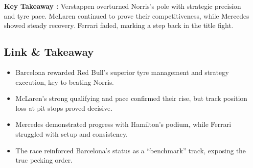 \textbf{Key Takeaway :}
Verstappen overturned Norris’s pole with strategic precision and tyre pace. McLaren continued to prove their competitiveness, while Mercedes showed steady recovery. Ferrari faded, marking a step back in the title fight.


\subsection{Link \& Takeaway}

\begin{itemize}
    \item Barcelona rewarded Red Bull’s superior tyre management and strategy execution, key to beating Norris. 
    \item McLaren’s strong qualifying and pace confirmed their rise, but track position loss at pit stops proved decisive. 
    \item Mercedes demonstrated progress with Hamilton’s podium, while Ferrari struggled with setup and consistency. 
    \item The race reinforced Barcelona’s status as a “benchmark” track, exposing the true pecking order.
\end{itemize}